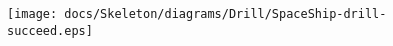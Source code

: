 \begin{figure}[H] 
\centering 
\texttt{[image: docs/Skeleton/diagrams/Drill/SpaceShip-drill-succeed.eps]} 
\caption{} 
\end{figure} 
